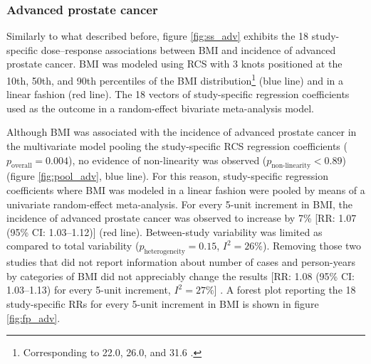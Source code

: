 \subsubsection{Advanced prostate cancer}

Similarly to what described before, figure \ref{fig:ss_adv} exhibits the 18 study-specific dose--response associations between BMI and incidence of advanced prostate cancer. BMI was modeled using RCS with 3 knots positioned at the 10th, 50th, and 90th percentiles of the BMI distribution\footnote{Corresponding to 22.0, 26.0, and 31.6 \kgmsq.} (blue line) and in a linear fashion (red line). The 18 vectors of study-specific regression coefficients used as the outcome in a random-effect bivariate meta-analysis model.

Although BMI was associated with the incidence of advanced prostate cancer in the multivariate model pooling the study-specific RCS regression coefficients ($p_{\textrm{overall}}=0.004$), no evidence of non-linearity was observed  ($p_{\textrm{non-linearity}}<0.89$) (figure \ref{fig:pool_adv}, blue line). For this reason, study-specific regression coefficients where BMI was modeled in a linear fashion were pooled by means of a univariate random-effect meta-analysis. For every 5-unit increment in BMI, the incidence of advanced prostate cancer was observed to increase by 7\% [RR: 1.07 (95\% CI: 1.03--1.12)] (red line). Between-study variability was limited as compared to total variability ($p_{\textrm{heterogeneity}}=0.15$, $I^2=26\%$). Removing those two studies that did not report information about number of cases and person-years by categories of BMI did not appreciably change the results [RR: 1.08 (95\% CI: 1.03--1.13) for every 5-unit increment, $I^2=27\%$] \citep{habel_body_2000, gong_obesity_2006}. A forest plot reporting the 18 study-specific RRs for every 5-unit increment in BMI is shown in figure \ref{fig:fp_adv}.

